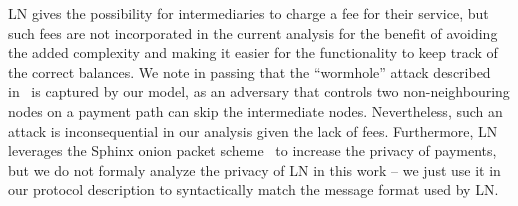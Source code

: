     LN gives the possibility for intermediaries to charge a fee for their
    service, but such fees are not incorporated in the current analysis
    for the benefit of avoiding the added complexity and making it
    easier for the functionality to keep track of the correct balances. We note
    in passing that the ``wormhole'' attack described
    in~\cite{DBLP:conf/ndss/MalavoltaMSKM19} is captured by our model, as an
    adversary that controls two non-neighbouring nodes on a payment path can
    skip the intermediate nodes. Nevertheless, such an attack is inconsequential
    in our analysis given the lack of fees. Furthermore, LN leverages the
    Sphinx onion packet scheme~\cite{sphinx} to increase the privacy of
    payments, but we do not formaly analyze the privacy of LN in this work -- we
    just use it in our protocol description to syntactically match the message
    format used by LN.
